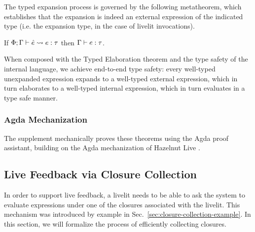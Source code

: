 The typed expansion process is governed by the following metatheorem, which establishes that the expansion
is indeed an external expression of the indicated type (i.e. the expansion type, in the case of livelit invocations).
\begin{theorem}
    If $\Phi; \Gamma \vdash \hat e \leadsto e : \tau$ then $\Gamma \vdash e : \tau$.
\end{theorem}

When composed with the Typed Elaboration theorem and the type safety of the internal
language, we achieve end-to-end type safety: every well-typed unexpanded
expression expands to a well-typed external expression, which in turn elaborates to a well-typed internal
expression, which in turn evaluates in a type safe manner.

\subsubsection{Agda Mechanization}
\label{sec:agda}
The supplement mechanically proves these theorems 
using the Agda proof assistant, building on the Agda mechanization 
of Hazelnut Live \cite{HazelnutLive}.


\subsection{Live Feedback via Closure Collection}\label{sec:calculus-closure-collection}
In order to support live feedback, a livelit needs to be able to ask the system
to evaluate expressions under one of the closures associated with the livelit.
This mechanism was introduced by example in Sec.~\ref{sec:closure-collection-example}.
In this section, we will formalize the process of efficiently collecting closures.

